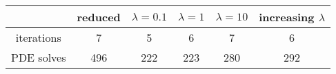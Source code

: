 \begin{tabular}{cccccc}
& reduced & $\lambda = 0.1$ & $\lambda = 1$ & $\lambda = 10$ & increasing $\lambda$ \\
\hline
iterations & 7 & 5 & 6 & 7 & 6 \\
PDE solves & 496 & 222 & 223 & 280 & 292 \\
\hline
\end{tabular}
